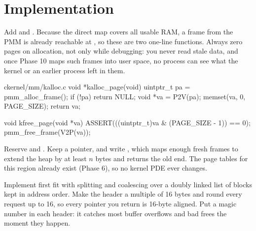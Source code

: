 \documentclass[11pt,a4paper]{article}
\begin{document}
\section{Implementation}

Add  and . Because the direct map covers all usable RAM, a frame from the PMM
is already reachable at , so these are two one-line functions. Always zero pages on allocation, not
only while debugging: you never read stale data, and once Phase 10 maps such frames into user space, no process can
see what the kernel or an earlier process left in them.

\begin{lst}{c}{kernel/mm/kalloc.c}
void *kalloc_page(void)
{
    uintptr_t pa = pmm_alloc_frame();
    if (!pa)
        return NULL;
    void *va = P2V(pa);
    memset(va, 0, PAGE_SIZE);
    return va;
}

void kfree_page(void *va)
{
    ASSERT(((uintptr_t)va & (PAGE_SIZE - 1)) == 0);
    pmm_free_frame(V2P(va));
}
\end{lst}

Reserve  and . Keep a  pointer, and write
, which maps enough fresh frames to extend the heap by at least $n$ bytes and returns the old end.
The page tables for this region already exist (Phase 6), so no kernel PDE ever changes.

Implement first fit with splitting and coalescing over a doubly linked list of blocks kept in address order. Make the
header a multiple of 16 bytes and round every request up to 16, so every pointer you return is 16-byte aligned. Put a
magic number in each header: it catches most buffer overflows and bad frees the moment they happen.
\end{document}
